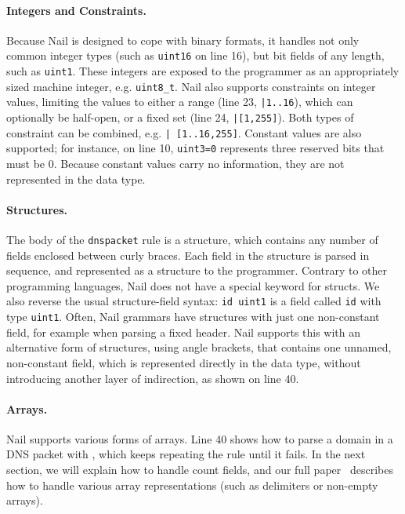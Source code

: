 \paragraph{Integers and Constraints.}
Because Nail is designed to cope with binary formats,
it handles not only common integer types (such as \texttt{uint16} on line 16), but bit fields of any
length, such as \texttt{uint1}. These integers are exposed to the programmer as an appropriately
sized machine integer, e.g. \texttt{uint8\_t}. Nail also supports constraints on integer values,
limiting the values to either a range (line 23, \texttt{|1..16}), which can optionally be half-open,
or a fixed set (line 24, \texttt{|[1,255]}). Both types of constraint can be combined, e.g. \texttt{|
  [1..16,255]}. Constant values are also supported; for instance, on line 10, \texttt{uint3=0} represents
three reserved bits that must be 0. Because constant values carry no information, they are not
represented in the data type.

\paragraph{Structures.}

The body of the \texttt{dnspacket} rule is a structure, which contains any number of fields enclosed
between  curly braces. Each field in the structure is parsed in sequence, and represented as a
structure to the programmer.  Contrary to other programming languages, Nail does not have a special
keyword for structs. We also reverse the usual structure-field syntax: \texttt{id uint1} is a field
called \texttt{id} with type \texttt{uint1}. Often, Nail grammars have
structures with just one non-constant field, for example when parsing a fixed header. Nail supports
this with an alternative form of structures,
using angle brackets, that contains one unnamed, non-constant field, which is represented directly
in the data type, without introducing another layer of indirection, as shown on line 40.


\paragraph{Arrays.}

Nail supports various forms of arrays. Line 40 shows how to parse a domain in a DNS packet with
, which keeps repeating the  rule until it fails.  In the next section, we will
explain how to handle count fields, and our full paper~\cite{bangert:nail} describes how to handle various array
representations (such as delimiters or non-empty arrays).


